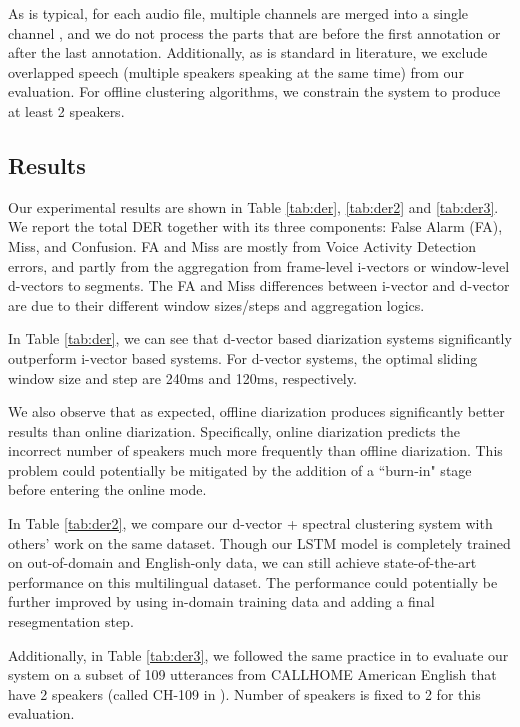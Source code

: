 \documentclass{article}
\begin{document}
As is typical, for each audio file, multiple channels are merged into a single channel
\cite{shum2013unsupervised,sell2015diarization,dimitriadis2017developing},
and we do not process the parts that are before the first
annotation or after the last annotation. Additionally, as is standard in literature, we exclude
overlapped speech (multiple speakers speaking at the same time) from our evaluation.
For offline clustering algorithms, we constrain the system to produce at least 2 speakers.

\subsection{Results}

Our experimental results are shown in Table \ref{tab:der}, \ref{tab:der2} and \ref{tab:der3}.
We report the total DER together with its three components: False Alarm (FA), Miss,
and Confusion. FA and Miss are mostly from Voice Activity Detection errors, and
partly from the aggregation from frame-level i-vectors or window-level d-vectors to segments.
The FA and Miss differences between i-vector and d-vector are due to their different
window sizes/steps and aggregation logics.

In Table \ref{tab:der}, we can see that d-vector based diarization systems significantly
outperform i-vector based systems. For d-vector systems,
the optimal sliding window size and step are 240ms and 120ms, respectively.

We also observe that as expected, offline diarization produces significantly better results than online diarization. Specifically, online diarization predicts the incorrect number of speakers much more frequently than offline diarization.
This problem could potentially be mitigated by the addition of a ``burn-in" stage before entering the online mode.

In Table \ref{tab:der2}, we compare our d-vector + spectral clustering system with others' work on the same dataset.
Though our LSTM model is completely trained on out-of-domain and English-only data, we can still achieve state-of-the-art performance on this multilingual dataset. The performance could potentially be further improved by using in-domain training data and adding a final resegmentation step.

Additionally, in Table \ref{tab:der3}, we followed the same practice in \cite{zajic2017speaker} to evaluate our system
on a subset of 109 utterances from CALLHOME American English that have 2 speakers (called CH-109 in \cite{dimitriadis2017developing}).
Number of speakers is fixed to 2 for this evaluation.
\end{document}
